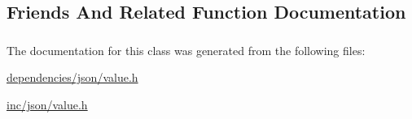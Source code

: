 \subsection{Friends And Related Function Documentation}
\hypertarget{classJson_1_1ValueConstIterator_a896c037a32087c5c20d97e64a1786880}{
\subsubsection[{Value}]{\hspace{0.3cm}{\ttfamily [friend]}}}\label{d8/d4f/classJson_1_1ValueConstIterator_a896c037a32087c5c20d97e64a1786880}


The documentation for this class was generated from the following files\-:\begin{DoxyCompactItemize}
\item 
\hyperlink{dependencies_2json_2value_8h}{dependencies/json/value.\-h}\item 
\hyperlink{inc_2json_2value_8h}{inc/json/value.\-h}\end{DoxyCompactItemize}
